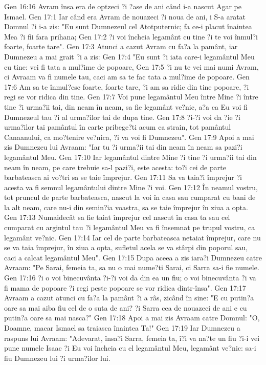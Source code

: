 Gen 16:16  Avram însa era de optzeci ?i ?ase de ani când i-a nascut Agar pe Ismael.
Gen 17:1  Iar când era Avram de nouazeci ?i noua de ani, i S-a aratat Domnul ?i i-a zis: "Eu sunt Dumnezeul cel Atotputernic; fa ce-i placut înaintea Mea ?i fii fara prihana;
Gen 17:2  ?i voi încheia legamânt cu tine ?i te voi înmul?i foarte, foarte tare".
Gen 17:3  Atunci a cazut Avram cu fa?a la pamânt, iar Dumnezeu a mai grait ?i a zis:
Gen 17:4  "Eu sunt ?i iata care-i legamântul Meu cu tine: vei fi tata a mul?ime de popoare,
Gen 17:5  ?i nu te vei mai numi Avram, ci Avraam va fi numele tau, caci am sa te fac tata a mul?ime de popoare.
Gen 17:6  Am sa te înmul?esc foarte, foarte tare, ?i am sa ridic din tine popoare, ?i regi se vor ridica din tine.
Gen 17:7  Voi pune legamântul Meu între Mine ?i între tine ?i urma?ii tai, din neam în neam, sa fie legamânt ve?nic, a?a ca Eu voi fi Dumnezeul tau ?i al urma?ilor tai de dupa tine.
Gen 17:8  ?i-?i voi da ?ie ?i urma?ilor tai pamântul în carte pribege?ti acum ca strain, tot pamântul Canaanului, ca mo?tenire ve?nica, ?i va voi fi Dumnezeu".
Gen 17:9  Apoi a mai zis Dumnezeu lui Avraam: "Iar tu ?i urma?ii tai din neam în neam sa pazi?i legamântul Meu.
Gen 17:10  Iar legamântul dintre Mine ?i tine ?i urma?ii tai din neam în neam, pe care trebuie sa-l pazi?i, este acesta: to?i cei de parte barbateasca ai vo?tri sa se taie împrejur.
Gen 17:11  Sa va taia?i împrejur ?i acesta va fi semnul legamântului dintre Mine ?i voi.
Gen 17:12  În neamul vostru, tot pruncul de parte barbateasca, nascut la voi în casa sau cumparat cu bani de la alt neam, care nu-i din semin?ia voastra, sa se taie împrejur în ziua a opta.
Gen 17:13  Numaidecât sa fie taiat împrejur cel nascut în casa ta sau cel cumparat cu argintul tau ?i legamântul Meu va fi însemnat pe trupul vostru, ca legamânt ve?nic.
Gen 17:14  Iar cel de parte barbateasca netaiat împrejur, care nu se va taia împrejur, în ziua a opta, sufletul acela se va stârpi din poporul sau, caci a calcat legamântul Meu".
Gen 17:15  Dupa aceea a zis iara?i Dumnezeu catre Avraam: "Pe Sarai, femeia ta, sa nu o mai nume?ti Sarai, ci Sarra sa-i fie numele.
Gen 17:16  ?i o voi binecuvânta ?i-?i voi da din ea un fiu; o voi binecuvânta ?i va fi mama de popoare ?i regi peste popoare se vor ridica dintr-însa".
Gen 17:17  Avraam a cazut atunci cu fa?a la pamânt ?i a râs, zicând în sine: "E cu putin?a oare sa mai aiba fiu cel de o suta de ani? ?i Sarra cea de nouazeci de ani e cu putin?a oare sa mai nasca?"
Gen 17:18  Apoi a mai zis Avraam catre Domnul: "O, Doamne, macar Ismael sa traiasca înaintea Ta!"
Gen 17:19  Iar Dumnezeu a raspuns lui Avraam: "Adevarat, însa?i Sarra, femeia ta, î?i va na?te un fiu ?i-i vei pune numele Isaac ?i Eu voi încheia cu el legamântul Meu, legamânt ve?nic: sa-i fiu Dumnezeu lui ?i urma?ilor lui.
